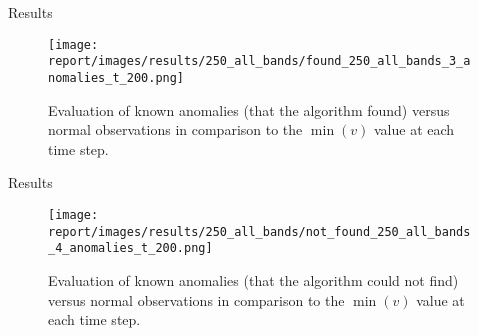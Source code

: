 \begin{frame}{Results}
    \begin{figure}
      \centering
      \texttt{[image: report/images/results/250\_all\_bands/found\_250\_all\_bands\_3\_anomalies\_t\_200.png]}
      \caption{Evaluation of known anomalies (that the \mlblink algorithm found) versus normal observations in comparison to the $\min(v)$ value at each time step.}
    \end{figure}
\end{frame}

\begin{frame}{Results}
    \begin{figure}
      \centering
      \texttt{[image: report/images/results/250\_all\_bands/not\_found\_250\_all\_bands\_4\_anomalies\_t\_200.png]}
      \caption{Evaluation of known anomalies (that the \mlblink algorithm could not find) versus normal observations in comparison to the $\min(v)$ value at each time step.}
      \label{fig:evaluation:v-versus-t:not-found}
    \end{figure}
\end{frame}


